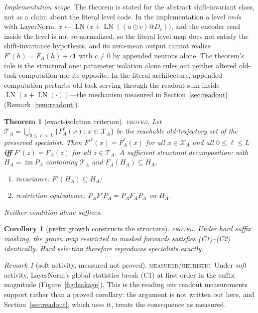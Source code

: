 \documentclass[11pt]{article}
\newtheorem{theorem}{Theorem}
\newtheorem{corollary}{Corollary}
\theoremstyle{definition}\newtheorem{definition}{Definition}
\theoremstyle{remark}\newtheorem{remark}{Remark}
\newcommand{\Xa}{\mathcal{X}_A}
\newcommand{\TA}{\mathcal{T}_A}
\begin{document}
\emph{Implementation scope.} The theorem is stated for the abstract shift-invariant class,
not as a claim about the literal level code. In the implementation a level \emph{ends}
with LayerNorm, $x\leftarrow\operatorname{LN}\bigl(x+\operatorname{LN}((u\odot v)@D_c)\bigr)$,
and the encoder read inside the level is not re-normalized, so the literal level map does
not satisfy the shift-invariance hypothesis, and its zero-mean output cannot realize
$F'(h)=F_A(h)+c\mathbf{1}$ with $c\neq0$ by appended neurons alone. The theorem's role is
the structural one: parameter isolation alone rules out neither altered old-task
computation nor its opposite. In the literal architecture, appended computation perturbs
old-task serving through the readout sum inside
$\operatorname{LN}(x+\operatorname{LN}(\cdot))$---the mechanism measured in
Section~\ref{sec:readout} (Remark~\ref{rem:readout}).

\begin{theorem}[exact-isolation criterion]\label{thm:criterion}
\textsc{proved.} Let $\TA=\bigcup_{0\le\ell<L}\{F_A^\ell(x):\ x\in\Xa\}$ be the reachable
old-trajectory set of the preserved specialist. Then
$F'^{\ell}(x)=F_A^{\ell}(x)$ for all $x\in\Xa$ and all $0\le\ell\le L$
\;\textbf{iff}\;
$F'(z)=F_A(z)$ for all $z\in\TA$.
A sufficient structural decomposition: with $H_A=\operatorname{im}P_A$ containing $\TA$
and $F_A(H_A)\subseteq H_A$,
\begin{enumerate}
\item[(C1)] \emph{invariance}: $F'(H_A)\subseteq H_A$;
\item[(C2)] \emph{restriction equivalence}: $P_AF'P_A = P_AF_AP_A$ on $H_A$.
\end{enumerate}
Neither condition alone suffices.
\end{theorem}

\begin{corollary}[prefix growth constructs the structure]\label{cor:prefix}
\textsc{proved.} Under hard suffix masking, the grown map restricted to masked forwards
satisfies (C1)--(C2) identically. Hard selection therefore reproduces specialists exactly.
\end{corollary}

\begin{remark}[soft activity, measured not proved]\label{rem:softln}
\textsc{measured/heuristic.} Under \emph{soft} activity, LayerNorm's global statistics
break (C1) at first order in the suffix magnitude
(Figure~\ref{fig:leakage}). This is the reading our readout
measurements support rather than a proved corollary: the argument is not written out here,
and Section~\ref{sec:readout}, which uses it, treats the consequence as measured.
\end{remark}
\end{document}
